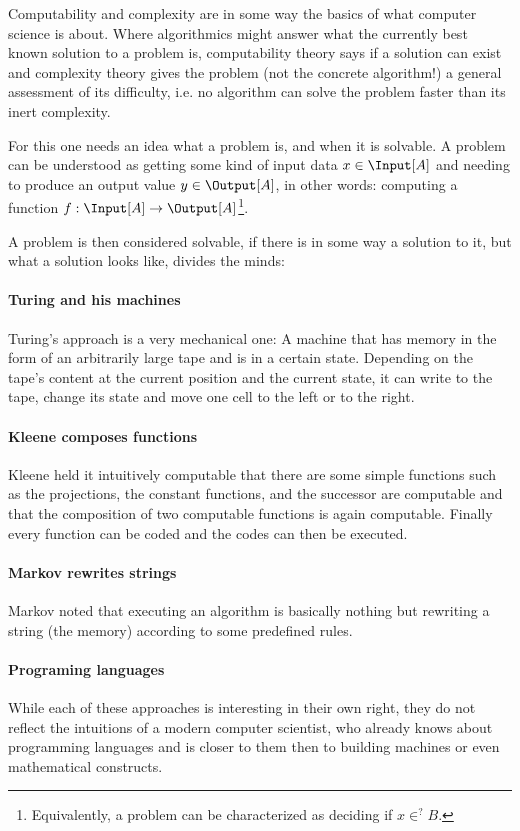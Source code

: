 Computability and complexity are in some way the basics of what computer
science is about. Where algorithmics might answer what the currently best known
solution to a problem is, computability theory says if a solution can exist and
complexity theory gives the problem (not the concrete algorithm!) a general
assessment of its difficulty, i.e. no algorithm can solve the problem faster 
than its inert complexity.

For this one needs an idea what a problem is, and when it is solvable. A 
problem can be understood as getting some kind of input data $x\in \Input[A]$ 
and needing to produce an output value $y\in \Output[A]$, in other words: 
computing a function $f:\Input[A] \rightarrow \Output[A]$\footnote{Equivalently, 
a problem can be characterized as deciding if $x\in^? B$.}.

A problem is then considered solvable, if there is in some way a solution to 
it, but what a solution looks like, divides the minds: 

\paragraph{Turing and his machines}
Turing's approach is a very mechanical one: A machine that has memory in the 
form of an arbitrarily large tape and is in a certain state. Depending on the 
tape's content at the current position and the current state, it can write to 
the tape, change its state and move one cell to the left or to the right.

\paragraph{Kleene composes functions}
Kleene held it intuitively computable that there are some simple functions 
such as the projections, the constant functions, and the successor are 
computable and that the composition of two computable functions is again 
computable. Finally every function can be coded and the codes can then be executed.

\paragraph{Markov rewrites strings}
Markov noted that executing an algorithm is basically nothing but rewriting a 
string (the memory) according to some predefined rules.

\paragraph{Programing languages}
While each of these approaches is interesting in their own right, they do not 
reflect the intuitions of a modern computer scientist, who already knows 
about programming languages and is closer to them then to building machines 
or even mathematical constructs.

